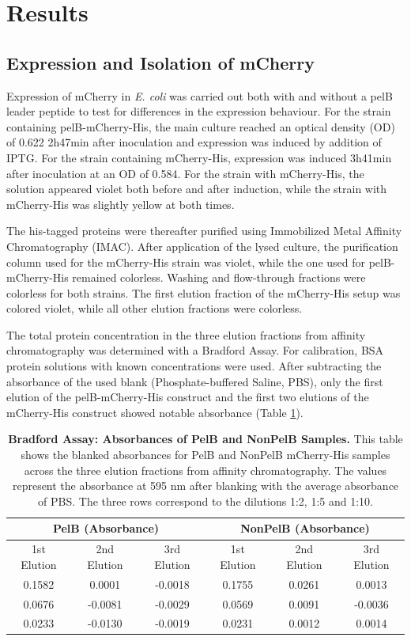 \documentclass[a4paper,12pt]{article}
\begin{document}
\section{Results}
\subsection{Expression and Isolation of mCherry}
Expression of mCherry in \emph{E. coli} was carried out both with and without a pelB leader peptide to test for differences in the expression behaviour. For the strain containing pelB-mCherry-His, the main culture reached an optical density (OD) of 0.622 2h47min after inoculation and expression was induced by addition of IPTG. For the strain containing mCherry-His, expression was induced 3h41min after inoculation at an OD of 0.584. For the strain with mCherry-His, the solution appeared violet both before and after induction, while the strain with mCherry-His was slightly yellow at both times.

The his-tagged proteins were thereafter purified using Immobilized Metal Affinity Chromatography (IMAC). After application of the lysed culture, the purification column used for the mCherry-His strain was violet, while the one used for pelB-mCherry-His remained colorless. Washing and flow-through fractions were colorless for both strains. The first elution fraction of the mCherry-His setup was colored violet, while all other elution fractions were colorless. 

The total protein concentration in the three elution fractions from affinity chromatography was determined with a Bradford Assay. For calibration, BSA protein solutions with known concentrations were used. After subtracting the absorbance of the used blank (Phosphate-buffered Saline, PBS), only the first elution of the pelB-mCherry-His construct and the first two elutions of the mCherry-His construct showed notable absorbance (Table \ref{tab:bradford1}). 

\begin{table}[h!]
    \centering
    \caption{\textbf{Bradford Assay: Absorbances of PelB and NonPelB Samples.} This table shows the blanked absorbances for PelB and NonPelB mCherry-His samples across the three elution fractions from affinity chromatography. The values represent the absorbance at 595 nm after blanking with the average absorbance of PBS. The three rows correspond to the dilutions 1:2, 1:5 and 1:10.}
    \begin{tabular}{ccc|ccc}
        \multicolumn{3}{c|}{\textbf{PelB (Absorbance)}} & \multicolumn{3}{c}{\textbf{NonPelB (Absorbance)}} \\
        \hline
        1st Elution & 2nd Elution & 3rd Elution & 1st Elution & 2nd Elution & 3rd Elution \\
        \hline
        0.1582 & 0.0001 & -0.0018 & 0.1755 & 0.0261 & 0.0013 \\
        0.0676 & -0.0081 & -0.0029 & 0.0569 & 0.0091 & -0.0036 \\
        0.0233 & -0.0130 & -0.0019 & 0.0231 & 0.0012 & 0.0014
    \end{tabular}
    \label{tab:bradford1}
\end{table}
\end{document}
